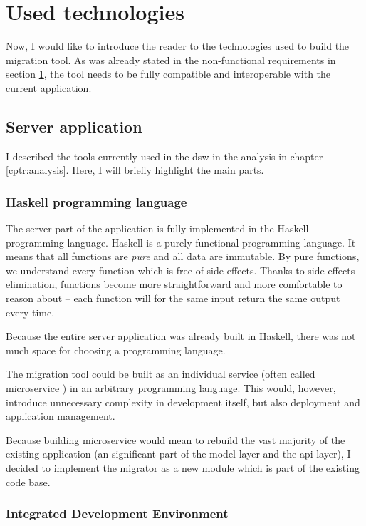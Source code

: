 \section{Used technologies}\label{sec:used-technologies}

Now, I would like to introduce the reader to the technologies used to build the migration tool.
As was already stated in the non-functional requirements in section \ref{sec:used-technologies}, the tool needs to be fully compatible and interoperable with the current application.

\subsection{Server application}

I described the tools currently used in the \gls{dsw} in the analysis in chapter \ref{cptr:analysis}.
Here, I will briefly highlight the main parts.

\subsubsection*{Haskell programming language}

The server part of the application is fully implemented in the Haskell programming language.
Haskell is a purely functional programming language.
It means that all functions are \textit{pure} and all data are immutable\cite{haskell-web}.
By pure functions, we understand every function which is free of side effects.
Thanks to side effects elimination, functions become more straightforward and more comfortable to reason about -- each function will for the same input return the same output every time.

Because the entire server application was already built in Haskell, there was not much space for choosing a programming language.

The migration tool could be built as an individual service (often called microservice \cite{micros-web}) in an arbitrary programming language.
This would, however, introduce unnecessary complexity in development itself, but also deployment and application management.

Because building microservice would mean to rebuild the vast majority of the existing application (an significant part of the model layer and the \gls{api} layer), I decided to implement the migrator as a new module which is part of the existing code base.

\subsubsection*{Integrated Development Environment}

